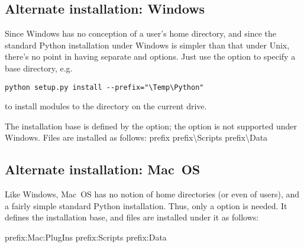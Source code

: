\documentclass{howto}
\begin{document}
\subsection{Alternate installation: Windows}
\label{sec:alt-windows}

Since Windows has no conception of a user's home directory, and since
the standard Python installation under Windows is simpler than that
under Unix, there's no point in having separate  and
 options.  Just use the  option to specify
a base directory, e.g.
\begin{verbatim}
python setup.py install --prefix="\Temp\Python"
\end{verbatim}
to install modules to the  directory on the current
drive.

The installation base is defined by the  option; the
 option is not supported under Windows.  Files are
installed as follows:
              {prefix}{}
              {prefix}{\textbackslash{}Scripts}
              {prefix}{\textbackslash{}Data}


\subsection{Alternate installation: Mac~OS}
\label{sec:alt-macos}

Like Windows, Mac~OS has no notion of home directories (or even of
users), and a fairly simple standard Python installation.  Thus, only a
 option is needed.  It defines the installation base, and 
files are installed under it as follows:


              {prefix}{:Mac:PlugIns}
              {prefix}{:Scripts}
              {prefix}{:Data}

\end{document}
